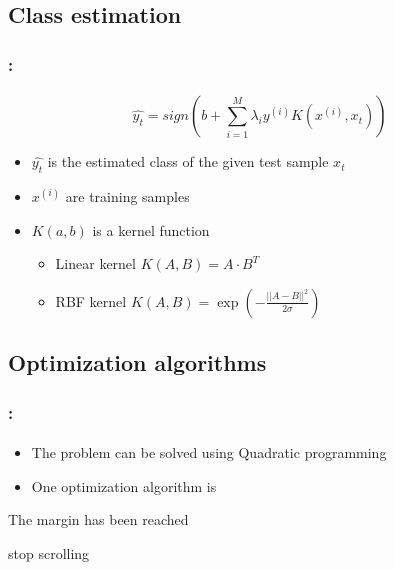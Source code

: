\documentclass[xcolor=table]{beamer}
\begin{document}
\subsection{Class estimation}

\begin{frame}
	\frametitle{\insertshortsubtitle: \insertsection}
	\framesubtitle{\insertsubsection}
	
	\[\hat{y_t} = sign(b + \sum^M_{i=1} \lambda_i y^{(i)} K(x^{(i)}, x_t))\]
	\begin{itemize}
		\item $ \hat{y_t} $ is the estimated class of the given test sample $ x_t $
		\item $ x^{(i)} $ are training samples
		\item $ K(a, b) $ is a kernel function
		\begin{itemize}
			\item Linear kernel $ K(A, B) = A \cdot B^T$
			\item RBF kernel $ K(A, B) = \exp(-\frac{||A-B||^2}{2\sigma})$
		\end{itemize}
	\end{itemize}
	
\end{frame}

\subsection{Optimization algorithms}

\begin{frame}
	\frametitle{\insertshortsubtitle: \insertsection}
	\framesubtitle{\insertsubsection}
	
	\begin{itemize}
		\item The problem can be solved using Quadratic programming
		\item One optimization algorithm is  \cite{1998-platt}
	\end{itemize}

	
\end{frame}





\begin{frame}[plain]
	
	\begin{center}
		\Huge 
		The margin has been reached  
		
		stop scrolling
	\end{center}
	
\end{frame}
\end{document}
